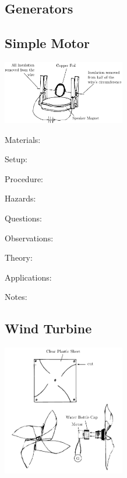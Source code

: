 \begin{multicols}{2}

\section*{Generators}


\subsection{Simple Motor}

\begin{center}
\includegraphics[width=0.4\textwidth]{./img/simple-motor.png}
\end{center}

\begin{description*}
\item[Materials:]{}
\item[Setup:]{}
\item[Procedure:]{}
\item[Hazards:]{}
\item[Questions:]{}
\item[Observations:]{}
\item[Theory:]{}
\item[Applications:]{}
\item[Notes:]{}
\end{description*}

\subsection{Wind Turbine}

\begin{center}
\includegraphics[width=0.4\textwidth]{./img/wind-turbine.png}
\end{center}


\end{multicols}
